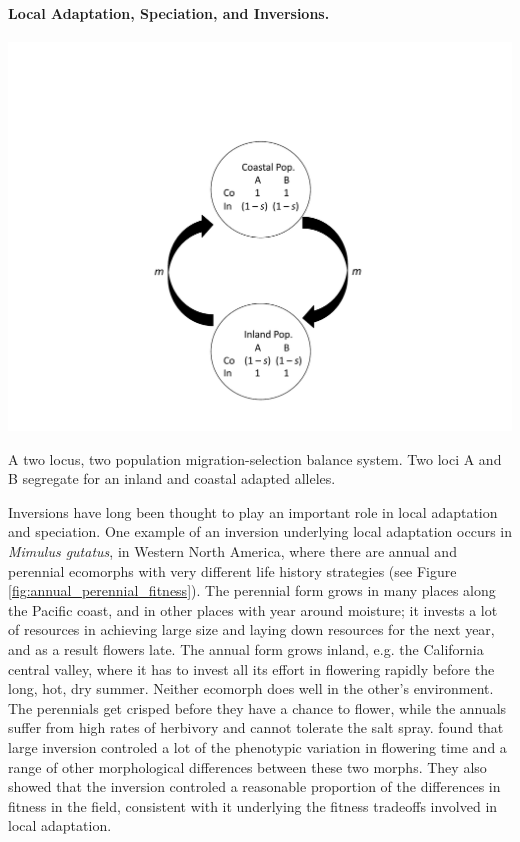 \paragraph{Local Adaptation, Speciation, and Inversions.}
\begin{marginfigure} %
\begin{center}
\includegraphics[width = \textwidth]{figures/inversion_mig_sel_balance.pdf}
\end{center}
\caption{A two locus, two population migration-selection balance system. Two loci A and B segregate for an inland and coastal adapted alleles.} \label{two_locus_mig}
\end{marginfigure}
Inversions have long been thought to play an important role in local adaptation and speciation.
One example of an inversion underlying local adaptation occurs in {\it Mimulus gutatus},  in Western North America, where there are annual and perennial ecomorphs with very different life history strategies (see Figure \ref{fig:annual_perennial_fitness}). The perennial form grows in many places along the Pacific coast, and in other places with year around moisture; it invests a lot of resources in
achieving large size and laying down resources for the next year, and as a result flowers late. The annual form grows inland, e.g. the California central valley,
where it has to invest all its effort in flowering rapidly before the long, hot, dry summer. Neither ecomorph does well in the other's environment. The perennials get crisped
before they have a chance to flower, while the annuals suffer from high rates of herbivory and cannot tolerate the salt spray.
\citet{lowry2010widespread} found that large inversion controled a lot of the phenotypic variation in
flowering time and a range of other morphological differences between these two morphs. They also showed that the inversion controled a reasonable proportion of the
differences in fitness in the field, consistent with it underlying the fitness tradeoffs involved in local adaptation.

